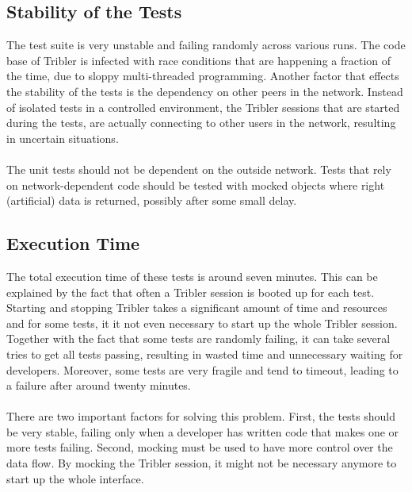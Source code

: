 \subsection{Stability of the Tests}
The test suite is very unstable and failing randomly across various runs. The code base of Tribler is infected with race conditions that are happening a fraction of the time, due to sloppy multi-threaded programming. Another factor that effects the stability of the tests is the dependency on other peers in the network. Instead of isolated tests in a controlled environment, the Tribler sessions that are started during the tests, are actually connecting to other users in the network, resulting in uncertain situations.\\\\
The unit tests should not be dependent on the outside network. Tests that rely on network-dependent code should be tested with mocked objects where right (artificial) data is returned, possibly after some small delay.

\subsection{Execution Time}
The total execution time of these tests is around seven minutes. This can be explained by the fact that often a Tribler session is booted up for each test. Starting and stopping Tribler takes a significant amount of time and resources and for some tests, it it not even necessary to start up the whole Tribler session. Together with the fact that some tests are randomly failing, it can take several tries to get all tests passing, resulting in wasted time and unnecessary waiting for developers. Moreover, some tests are very fragile and tend to timeout, leading to a failure after around twenty minutes.\\\\
There are two important factors for solving this problem. First, the tests should be very stable, failing only when a developer has written code that makes one or more tests failing. Second, mocking must be used to have more control over the data flow. By mocking the Tribler session, it might not be necessary anymore to start up the whole interface.

